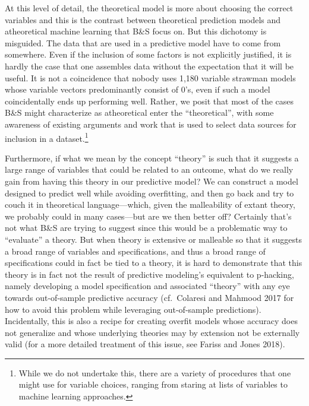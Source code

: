 \documentclass[
]{article}
\begin{document}
At this level of detail, the theoretical model is more about choosing the correct variables and this is the contrast between theoretical prediction models and atheoretical machine learning that B\&S focus on. But this dichotomy is misguided. The data that are used in a predictive model have to come from somewhere. Even if the inclusion of some factors is not explicitly justified, it is hardly the case that one assembles data without the expectation that it will be useful. It is not a coincidence that nobody uses 1,180 variable strawman models whose variable vectors predominantly consist of 0's, even if such a model coincidentally ends up performing well. Rather, we posit that most of the cases B\&S might characterize as atheoretical enter the ``theoretical'', with some awareness of existing arguments and work that is used to select data sources for inclusion in a dataset.\footnote{While we do not undertake this, there are a variety of procedures that one might use for variable choices, ranging from staring at lists of variables to machine learning approaches.}

Furthermore, if what we mean by the concept ``theory'' is such that it suggests a large range of variables that could be related to an outcome, what do we really gain from having this theory in our predictive model? We can construct a model designed to predict well while avoiding overfitting, and then go back and try to couch it in theoretical language---which, given the malleability of extant theory, we probably could in many cases---but are we then better off? Certainly that's not what B\&S are trying to suggest since this would be a problematic way to ``evaluate'' a theory. But when theory is extensive or malleable so that it suggests a broad range of variables and specifications, and thus a broad range of specifications could in fact be tied to a theory, it is hard to demonstrate that this theory is in fact not the result of predictive modeling's equivalent to p-hacking, namely developing a model specification and associated ``theory'' with any eye towards out-of-sample predictive accuracy (cf.~Colaresi and Mahmood 2017 for how to avoid this problem while leveraging out-of-sample predictions). Incidentally, this is also a recipe for creating overfit models whose accuracy does not generalize and whose underlying theories may by extension not be externally valid (for a more detailed treatment of this issue, see Fariss and Jones 2018).
\end{document}
